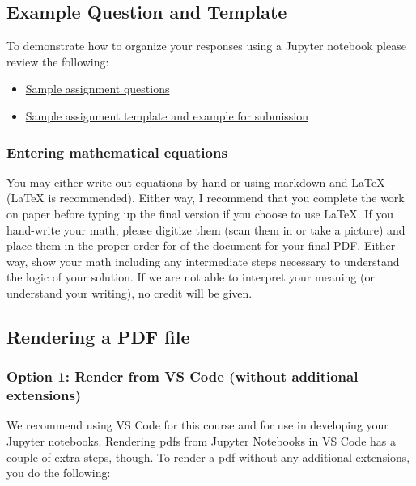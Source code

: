 \documentclass[
  letterpaper,
  DIV=11,
  numbers=noendperiod]{scrartcl}
\providecommand{\tightlist}{%
  \setlength{\itemsep}{0pt}\setlength{\parskip}{0pt}}\usepackage{longtable,booktabs,array}
\begin{document}
\subsection{Example Question and
Template}\label{example-question-and-template}

To demonstrate how to organize your responses using a Jupyter notebook
please review the following:

\begin{itemize}
\tightlist
\item
  \href{../shared/assignment0.ipynb}{Sample assignment questions}
\item
  \href{../shared/assignment_template.ipynb}{Sample assignment template
  and example for submission}
\end{itemize}

\subsubsection{Entering mathematical
equations}\label{entering-mathematical-equations}

You may either write out equations by hand or using markdown and
\href{https://tobi.oetiker.ch/lshort/lshort.pdf}{LaTeX} (LaTeX is
recommended). Either way, I recommend that you complete the work on
paper before typing up the final version if you choose to use LaTeX. If
you hand-write your math, please digitize them (scan them in or take a
picture) and place them in the proper order for of the document for your
final PDF. Either way, show your math including any intermediate steps
necessary to understand the logic of your solution. If we are not able
to interpret your meaning (or understand your writing), no credit will
be given.

\subsection{Rendering a PDF file}\label{rendering-a-pdf-file}

\subsubsection{Option 1: Render from VS Code (without additional
extensions)}\label{option-1-render-from-vs-code-without-additional-extensions}

We recommend using VS Code for this course and for use in developing
your Jupyter notebooks. Rendering pdfs from Jupyter Notebooks in VS Code
has a couple of extra steps, though. To render a pdf without any
additional extensions, you do the following:
\end{document}
